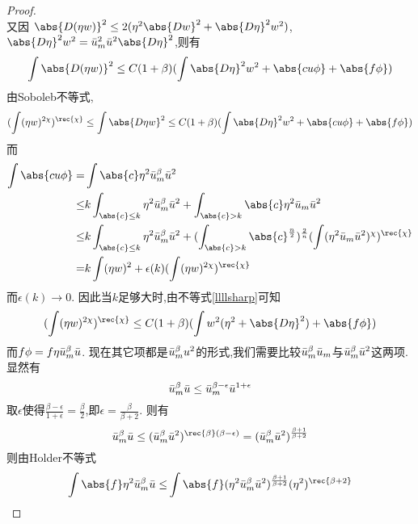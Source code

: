 \begin{proof}
\begin{equation}
    \end{equation}
    又因 $\abs{D(\eta w)}^2 \le 2(\eta^2\abs{Dw}^2+\abs{D\eta}^2w^2)$, $\abs{D\eta}^2w^2=\um^2\ub^2\abs{D\eta}^2$,则有
    \begin{equation}
        \int \abs{D(\eta w)}^2 \le C(1+\beta)(\int \abs{D\eta}^2w^2+\abs{cu\phi}+\abs{f\phi})
    \end{equation}
    由Soboleb不等式,
    \begin{equation}\label{llllsharp}
        (\int (\eta w)^{2\chi})^\rec{\chi} \le \int \abs{D\eta w}^2 \le C(1+\beta)(\int \abs{D\eta}^2w^2+\abs{cu\phi}+\abs{f\phi})
    \end{equation}
    而
    \begin{equation}
        \begin{split}
            \int \abs{cu\phi} = & \int \abs{c}\eta^2\um^\beta \ub^2 \\
            \le & k \int_{\abs{c}\le k}\eta^2 \um^\beta \ub^2 + \int_{\abs{c}>k}\abs{c}\eta^2\um\ub^2 \\
            \le& k \int_{\abs{c}\le k} \eta^2 \um^\beta \ub^2+(\int_{\abs{c}>k}\abs{c}^\frac{n}{2})^\frac{2}{n}(\int (\eta^2\um\ub^2)^\chi)^\rec{\chi} \\
            =& k \int (\eta w)^2 + \epsilon(k)(\int (\eta w)^{2\chi})^\rec{\chi}
        \end{split}
    \end{equation}
    而$\epsilon(k) \to 0$. 因此当$k$足够大时,由不等式\eqref{llllsharp}可知
    \begin{equation}\label{llllplus}
        (\int (\eta w)^{2\chi})^\rec{\chi} \le C(1+\beta)(\int w^2(\eta^2+\abs{D\eta}^2)+\abs{f\phi})
    \end{equation}
    而$f\phi=f\eta{\bar{u}_m}^\beta{\bar{u}}$. 现在其它项都是${\bar{u}_m}^\beta u^2$的形式,我们需要比较${\bar{u}_m}^\beta {\bar{u}_m}$与${\bar{u}_m}^\beta{\bar{u}}^2$这两项.显然有
    \begin{equation}
        {\bar{u}_m}^\beta {\bar{u}} \le {\bar{u}_m}^{\beta-\epsilon}{\bar{u}}^{1+\epsilon}
    \end{equation}
    取$\epsilon$使得$\frac{\beta-\epsilon}{1+\epsilon}=\frac{\beta}{2}$,即$\epsilon=\frac{\beta}{\beta+2}$. 则有
    \begin{equation}
        \um^\beta\ub \le (\um^\beta \ub^2)^{\rec{\beta}(\beta-\epsilon)}=(\um^\beta \ub^2)^\frac{\beta+1}{\beta+2}
    \end{equation}
    则由Holder不等式
    \begin{equation}
        \begin{split}
            \int \abs{f}\eta^2 \um^\beta \ub \le & \int \abs{f}(\eta^2 \um^\beta \ub^2)^\frac{\beta+1}{\beta+2}(\eta^2)^\rec{\beta+2} \\

\end{split}
\end{equation}
\end{proof}
